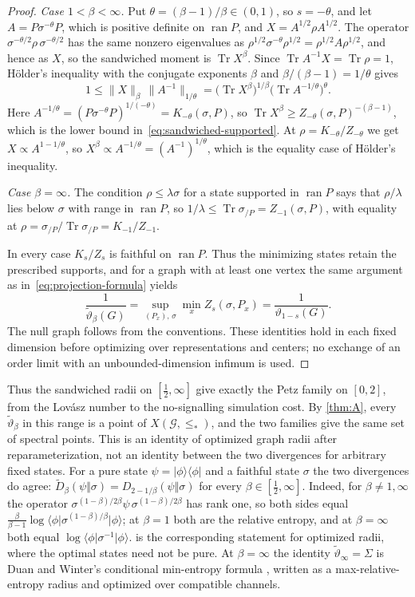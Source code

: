 \documentclass[11pt]{article}
\theoremstyle{definition}
\DeclareMathOperator{\Tr}{Tr}
\DeclareMathOperator{\ran}{ran}
\newcommand{\vt}{\vartheta}
\newcommand{\cG}{\mathcal G}
\newcommand{\Xs}{X(\cG,\le_*)}
\newcommand{\ket}[1]{\lvert #1\rangle}
\newcommand{\bra}[1]{\langle #1\rvert}
\newcommand{\proj}[1]{\ket{#1}\!\bra{#1}}
\newcommand{\nrm}[1]{\lVert #1\rVert}
\begin{document}
\begin{proof}
\emph{Case $1<\beta<\infty$.}  Put $\theta=(\beta-1)/\beta\in(0,1)$,
so $s=-\theta$, and let $A=P\sigma^{-\theta}P$, which is positive
definite on $\ran P$, and $X=A^{1/2}\rho A^{1/2}$.  The operator
$\sigma^{-\theta/2}\rho\,\sigma^{-\theta/2}$ has the same nonzero eigenvalues
as $\rho^{1/2}\sigma^{-\theta}\rho^{1/2}=\rho^{1/2}A\rho^{1/2}$, and hence as
$X$, so the sandwiched moment is $\Tr X^\beta$.  Since
$\Tr A^{-1}X=\Tr\rho=1$, H\"older's inequality with the conjugate exponents
$\beta$ and $\beta/(\beta-1)=1/\theta$ gives
\[
 1\le\nrm X_\beta\,\nrm{A^{-1}}_{1/\theta}
 =\bigl(\Tr X^\beta\bigr)^{1/\beta}\bigl(\Tr A^{-1/\theta}\bigr)^{\theta}.
\]
Here $A^{-1/\theta}=(P\sigma^{-\theta}P)^{1/(-\theta)}=K_{-\theta}(\sigma,P)$,
so $\Tr X^\beta\ge Z_{-\theta}(\sigma,P)^{-(\beta-1)}$, which is the lower bound
in~\eqref{eq:sandwiched-supported}.  At $\rho=K_{-\theta}/Z_{-\theta}$ we get
$X\propto A^{1-1/\theta}$, so $X^\beta\propto A^{-1/\theta}=(A^{-1})^{1/\theta}$,
which is the equality case of H\"older's inequality.

\emph{Case $\beta=\infty$.}  The condition $\rho\le\lambda\sigma$ for a state
supported in $\ran P$ says that $\rho/\lambda$ lies below $\sigma$ with
range in $\ran P$, so
$1/\lambda\le\Tr\sigma_{/P}=Z_{-1}(\sigma,P)$, with equality at
$\rho=\sigma_{/P}/\Tr\sigma_{/P}=K_{-1}/Z_{-1}$.

In every case $K_s/Z_s$ is faithful on $\ran P$.  Thus the minimizing
states retain the prescribed supports, and for a graph with at least one
vertex the same
argument as in~\eqref{eq:projection-formula} yields
\[
 \frac1{\widetilde\vt_\beta(G)}
 =\sup_{(P_x),\,\sigma}\min_x Z_s(\sigma,P_x)
 =\frac1{\vt_{1-s}(G)}.
\]
The null graph follows from the conventions.  These identities hold in
each fixed dimension before optimizing over representations and centers;
no exchange of an order limit with an unbounded-dimension infimum is used.
\end{proof}

Thus the sandwiched radii on $[\frac12,\infty]$ give exactly the Petz family
on $[0,2]$, from the Lov\'asz number to the no-signalling simulation cost.
By \cref{thm:A}, every
$\widetilde\vt_\beta$ in this range is a point of $\Xs$, and the two
families give the same set of spectral points.  This is an identity of
optimized graph radii after reparameterization, not an identity between
the two divergences for arbitrary fixed states.  For a pure state
$\psi=\proj\phi$ and a faithful state $\sigma$ the two divergences do agree:
$\widetilde D_\beta(\psi\Vert\sigma)=D_{2-1/\beta}(\psi\Vert\sigma)$ for
every $\beta\in[\frac12,\infty]$.  Indeed, for $\beta\ne1,\infty$ the
operator $\sigma^{(1-\beta)/2\beta}\psi\,\sigma^{(1-\beta)/2\beta}$ has rank
one, so both sides equal
$\frac{\beta}{\beta-1}\log\bra\phi\sigma^{(1-\beta)/\beta}\ket\phi$; at
$\beta=1$ both are the relative entropy, and at $\beta=\infty$ both equal
$\log\bra\phi\sigma^{-1}\ket\phi$.   is the
corresponding statement for optimized radii, where the optimal states need
not be pure.  At $\beta=\infty$ the
identity $\widetilde\vt_\infty=\Sigma$ is Duan and Winter's conditional
min-entropy formula \cite[Theorem~2]{DuanWinter2016}, written as a
max-relative-entropy radius and optimized over compatible channels.
\end{document}
